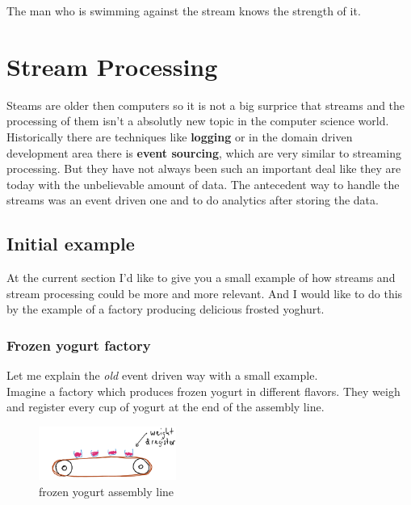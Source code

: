 \begin{savequote}[75mm]
The man who is swimming against the stream knows the strength of it.
\end{savequote}

\chapter{Stream Processing}
Steams are older then computers so it is not a big surprice that streams
and the processing of them isn't a absolutly new topic in the computer science world.
Historically there are techniques like \textbf{logging} or in the domain driven development area there is \textbf{event sourcing},
which are very similar to streaming processing.
But they have not always been such an important deal like they are today with the unbelievable amount of data.
The antecedent way to handle the streams was an event driven one and to do analytics after storing the data.\\


\section{Initial example}
At the current section I'd like to give you a small example of how streams and stream processing could be more and more
relevant. And I would like to do this by the example of a factory producing delicious frosted yoghurt.

\newpage

\subsection{Frozen yogurt factory}
Let me explain the \textit{old} event driven way with a small example.\\
Imagine a factory which produces frozen yogurt in different flavors.
They weigh and register every cup of yogurt at the end of the assembly line.\\

\begin{figure}[H]
\centering
\captionsetup{justification=centering}
\includegraphics[width=0.4\textwidth]{images/cups.png}
\caption[Frozen yogurt assembly line]{frozen yogurt assembly line}
\end{figure}

